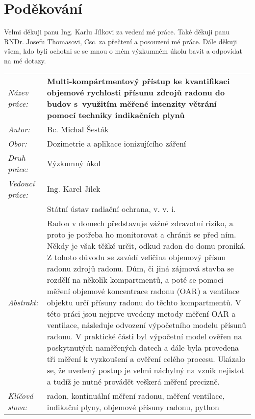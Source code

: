 \section*{Poděkování}
Velmi děkuji panu Ing. Karlu Jílkovi za vedení mé práce. Také děkuji panu RNDr. Josefu Thomasovi, Csc. za přečtení a posouzení mé práce. Dále děkuji všem, kdo byli ochotni se se mnou o mém výzkumném úkolu bavit a odpovídat na mé dotazy. 
\newpage
\begin{tabularx}{\textwidth}{>{\itshape}l X}
  Název práce: & \textbf{Multi-kompártmentový přístup ke kvantifikaci  objemové rychlosti přísunu zdrojů radonu do budov s využitím měřené intenzity větrání pomocí techniky indikačních plynů}\\
  Autor: & Bc. Michal Šesták\\
  Obor: & Dozimetrie a aplikace ionizujícího záření\\
  Druh práce: & Výzkumný úkol\\
  Vedoucí práce: & Ing. Karel Jílek\\ 
               & Státní ústav radiační ochrana, v. v. i.\\
  Abstrakt: & Radon v domech představuje vážné zdravotní riziko, a proto je potřeba ho monitorovat a chránit se před ním. Někdy je však těžké určit, odkud radon do domu proniká. Z tohoto důvodu se zavádí veličina objemový přísun radonu zdrojů radonu. Dům, či jiná zájmová stavba se rozdělí na několik kompartmentů, a poté se pomocí měření objemové koncentrace radonu (OAR) a ventilace objektu určí přísuny radonu do těchto kompartmentů. V této práci jsou nejprve uvedeny metody měření OAR a ventilace, následuje odvození výpočetního modelu přísunů radonu. V praktické části byl výpočetní model ověřen na poskytnutých naměřených datech a dále byla provedena tři měření k vyzkoušení a ověření celého procesu. Ukázalo se, že uvedený postup je velmi náchylný na vznik nejistot a tudíž
  je nutné provádět veškerá měření precizně.\\
  Klíčová slova: & radon, kontinuální měření radonu, měření ventilace, indikační plyny, objemové přísuny radonu, python  
\end{tabularx}
\newpage
